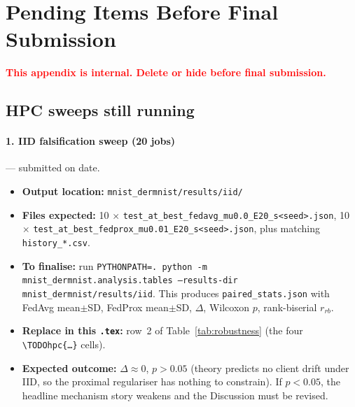 \documentclass[11pt,a4paper]{article}
\newif\ifshowtodo
\newcommand{\TODOhpc}[1]{%
  \ifshowtodo\textcolor{red}{\textbf{[HPC PENDING: #1]}}\else#1\fi}
\begin{document}
\ifshowtodo
\section{Pending Items Before Final Submission}\label{sec:todo}
\textcolor{red}{\textbf{This appendix is internal. Delete or hide before
final submission.}}

\subsection*{HPC sweeps still running}

\paragraph{1. IID falsification sweep (20 jobs)} --- submitted on
\TODOhpc{date}.
\begin{itemize}
\item \textbf{Output location:} \texttt{mnist\_dermnist/results/iid/}
\item \textbf{Files expected:} 10 $\times$ \texttt{test\_at\_best\_fedavg\_mu0.0\_E20\_s<seed>.json},
  10 $\times$ \texttt{test\_at\_best\_fedprox\_mu0.01\_E20\_s<seed>.json},
  plus matching \texttt{history\_*.csv}.
\item \textbf{To finalise:} run
  \texttt{PYTHONPATH=. python -m mnist\_dermnist.analysis.tables --results-dir mnist\_dermnist/results/iid}.
  This produces \texttt{paired\_stats.json} with FedAvg mean$\pm$SD,
  FedProx mean$\pm$SD, $\Delta$, Wilcoxon $p$, rank-biserial $r_{rb}$.
\item \textbf{Replace in this \texttt{.tex}:} row~2 of
  Table~\ref{tab:robustness} (the four \texttt{\textbackslash TODOhpc\{\ldots\}} cells).
\item \textbf{Expected outcome:} $\Delta \approx 0$, $p > 0.05$ (theory
  predicts no client drift under IID, so the proximal regulariser has
  nothing to constrain). If $p < 0.05$, the headline mechanism story
  weakens and the Discussion must be revised.
\end{itemize}
\end{document}
